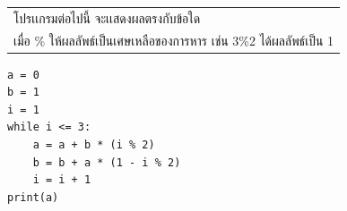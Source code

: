 ﻿%
\question \begin{tabular}[t]{@{}l@{}}โปรเเกรมต่อไปนี้ จะเเสดงผลตรงกับข้อใด
\\เมื่อ \% ให้ผลลัพธ์เป็นเศษเหลือของการหาร เช่น 3\%2 ได้ผลลัพธ์เป็น 1
\end{tabular}
\begin{verbatim}
a = 0
b = 1
i = 1
while i <= 3:
    a = a + b * (i % 2)
    b = b + a * (1 - i % 2)
    i = i + 1
print(a)
\end{verbatim}

